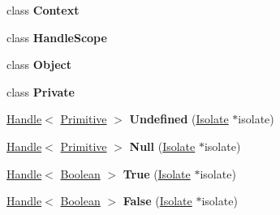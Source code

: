 \begin{DoxyCompactItemize}
\item 
\hypertarget{classv8_1_1_handle_ac26c806e60ca4a0547680edb68f6e39b}{}class {\bfseries Context}\label{classv8_1_1_handle_ac26c806e60ca4a0547680edb68f6e39b}

\item 
\hypertarget{classv8_1_1_handle_a5f127e488db492b05c8542cec0b880b7}{}class {\bfseries Handle\+Scope}\label{classv8_1_1_handle_a5f127e488db492b05c8542cec0b880b7}

\item 
\hypertarget{classv8_1_1_handle_a0720b5f434e636e22a3ed34f847eec57}{}class {\bfseries Object}\label{classv8_1_1_handle_a0720b5f434e636e22a3ed34f847eec57}

\item 
\hypertarget{classv8_1_1_handle_ac96b60d37bd806132da680e187dc2288}{}class {\bfseries Private}\label{classv8_1_1_handle_ac96b60d37bd806132da680e187dc2288}

\item 
\hypertarget{classv8_1_1_handle_a54e0b3d94c2292e9f7d4fc1618ecfdd6}{}\hyperlink{classv8_1_1_handle}{Handle}$<$ \hyperlink{classv8_1_1_primitive}{Primitive} $>$ {\bfseries Undefined} (\hyperlink{classv8_1_1_isolate}{Isolate} $\ast$isolate)\label{classv8_1_1_handle_a54e0b3d94c2292e9f7d4fc1618ecfdd6}

\item 
\hypertarget{classv8_1_1_handle_a495be557de6f0ea3848a2e8fc6505577}{}\hyperlink{classv8_1_1_handle}{Handle}$<$ \hyperlink{classv8_1_1_primitive}{Primitive} $>$ {\bfseries Null} (\hyperlink{classv8_1_1_isolate}{Isolate} $\ast$isolate)\label{classv8_1_1_handle_a495be557de6f0ea3848a2e8fc6505577}

\item 
\hypertarget{classv8_1_1_handle_a29e5558f47ee7c44b54dc3c20eaceb32}{}\hyperlink{classv8_1_1_handle}{Handle}$<$ \hyperlink{classv8_1_1_boolean}{Boolean} $>$ {\bfseries True} (\hyperlink{classv8_1_1_isolate}{Isolate} $\ast$isolate)\label{classv8_1_1_handle_a29e5558f47ee7c44b54dc3c20eaceb32}

\item 
\hypertarget{classv8_1_1_handle_af328581ad265dc321eb55a587708eedc}{}\hyperlink{classv8_1_1_handle}{Handle}$<$ \hyperlink{classv8_1_1_boolean}{Boolean} $>$ {\bfseries False} (\hyperlink{classv8_1_1_isolate}{Isolate} $\ast$isolate)\label{classv8_1_1_handle_af328581ad265dc321eb55a587708eedc}

\end{DoxyCompactItemize}


